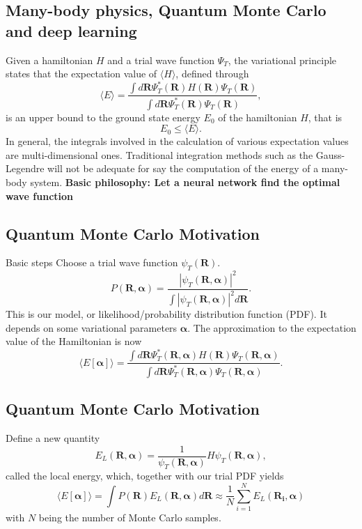 \documentclass[%
oneside,                 %
final,                   %
10pt]{article}
\begin{document}
\subsection{Many-body physics, Quantum Monte Carlo and deep learning}
\begin{block}{}
Given a hamiltonian $H$ and a trial wave function $\Psi_T$, the variational principle states that the expectation value of $\langle H \rangle$, defined through 
\[
   \langle E \rangle =
   \frac{\int d\bm{R}\Psi^{\ast}_T(\bm{R})H(\bm{R})\Psi_T(\bm{R})}
        {\int d\bm{R}\Psi^{\ast}_T(\bm{R})\Psi_T(\bm{R})},
\]
is an upper bound to the ground state energy $E_0$ of the hamiltonian $H$, that is 
\[
    E_0 \le \langle E \rangle.
\]
In general, the integrals involved in the calculation of various  expectation values  are multi-dimensional ones. Traditional integration methods such as the Gauss-Legendre will not be adequate for say the  computation of the energy of a many-body system.  \textbf{Basic philosophy: Let a neural network find the optimal wave function}
\end{block}

\subsection{Quantum Monte Carlo Motivation}
\begin{block}{Basic steps }
Choose a trial wave function
$\psi_T(\bm{R})$.
\[
   P(\bm{R},\bm{\alpha})= \frac{\left|\psi_T(\bm{R},\bm{\alpha})\right|^2}{\int \left|\psi_T(\bm{R},\bm{\alpha})\right|^2d\bm{R}}.
\]
This is our model, or likelihood/probability distribution function  (PDF). It depends on some variational parameters $\bm{\alpha}$.
The approximation to the expectation value of the Hamiltonian is now 
\[
   \langle E[\bm{\alpha}] \rangle = 
   \frac{\int d\bm{R}\Psi^{\ast}_T(\bm{R},\bm{\alpha})H(\bm{R})\Psi_T(\bm{R},\bm{\alpha})}
        {\int d\bm{R}\Psi^{\ast}_T(\bm{R},\bm{\alpha})\Psi_T(\bm{R},\bm{\alpha})}.
\]
\end{block}

\subsection{Quantum Monte Carlo Motivation}
\begin{block}{Define a new quantity }
\[
   E_L(\bm{R},\bm{\alpha})=\frac{1}{\psi_T(\bm{R},\bm{\alpha})}H\psi_T(\bm{R},\bm{\alpha}),
\]
called the local energy, which, together with our trial PDF yields
\[
  \langle E[\bm{\alpha}] \rangle=\int P(\bm{R})E_L(\bm{R},\bm{\alpha}) d\bm{R}\approx \frac{1}{N}\sum_{i=1}^NE_L(\bm{R_i},\bm{\alpha})
\]
with $N$ being the number of Monte Carlo samples.
\end{block}
\end{document}
